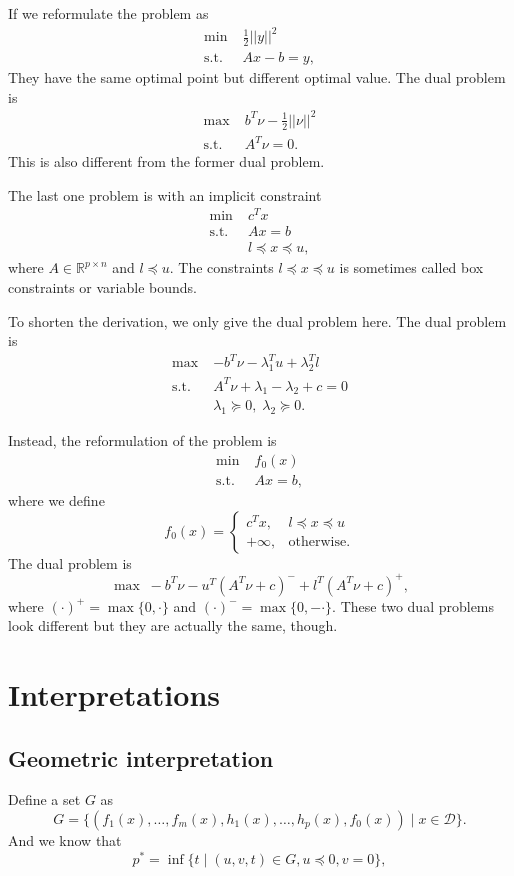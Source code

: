\documentclass[lang=en,color=blue,mode=fancy,titlestyle=hang]{elegantbook}
\begin{document}
If we reformulate the problem as
\begin{align*}
\min \; &\frac12 ||y||^2\\
\text{s.t.} \; &Ax - b = y,
\end{align*}
They have the same optimal point but different optimal value. The dual problem is
\begin{align*}
\max \; &b^T \nu - \frac12 ||\nu||^2\\
\text{s.t.} \; &A^T \nu = 0.
\end{align*}
This is also different from the former dual problem.

The last one problem is with an implicit constraint
\begin{align*}
\min \; &c^T x\\
\text{s.t.} \; &Ax = b\\
&l \preceq x \preceq u,
\end{align*}
where $A \in \mathbb{R}^{p \times n}$ and $l \preceq u$. The constraints $l \preceq x \preceq u$ is
sometimes called box constraints or variable bounds.

To shorten the derivation, we only give the dual problem here. The dual problem is
\begin{align*}
\max \; &-b^T \nu - \lambda_1^T u + \lambda_2^T l\\
\text{s.t.} \; &A^T \nu + \lambda_1 - \lambda_2 + c = 0\\
&\lambda_1 \succeq 0, \; \lambda_2 \succeq 0.
\end{align*}

Instead, the reformulation of the problem is
\begin{align*}
\min \; &f_0(x)\\
\text{s.t.} \; &Ax = b,
\end{align*}
where we define
\[
f_0(x) = \begin{cases}
c^T x, & l \preceq x \preceq u\\
+ \infty, & \text{otherwise}.
\end{cases}
\]
The dual problem is
\[
\max \; -b^T \nu - u^T (A^T \nu + c)^- + l^T (A^T \nu + c)^+,
\]
where $(\cdot)^+ = \max\{0, \cdot\}$ and $(\cdot)^- = \max\{0, -\cdot\}$. These two dual problems look
different but they are actually the same, though.

\section{Interpretations}
\subsection{Geometric interpretation}
Define a set $G$ as
\[
G = \{ (f_1(x), \ldots, f_m(x), h_1(x), \ldots, h_p(x), f_0(x)) \;|\; x \in \mathcal{D} \}.
\]
And we know that
\[
p^* =  \inf \{ t \;|\; (u, v, t) \in G, u \preceq 0, v = 0\},
\]
\end{document}
